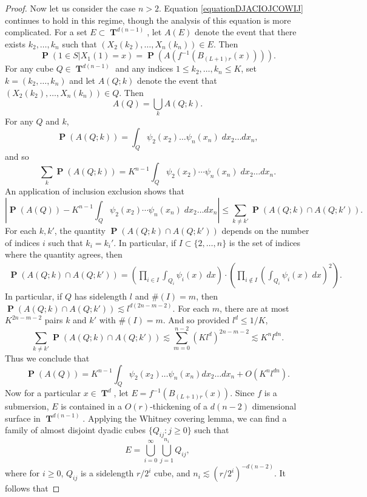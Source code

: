 \documentclass[12pt,reqno]{article}
\numberwithin{equation}{section}
\DeclareMathOperator{\TT}{\mathbf{T}}
\numberwithin{theorem}{section}
\DeclareMathOperator{\PP}{\mathbf{P}}
\begin{document}
\begin{proof}
    Now let us consider the case $n > 2$. Equation \eqref{equationDJACIOJCOWIJ} continues to hold in this regime, though the analysis of this equation is more complicated. For a set $E \subset \TT^{d(n-1)}$, let $A(E)$ denote the event that there exists $k_2,\dots,k_n$ such that $(X_2(k_2),\dots,X_n(k_n)) \in E$. Then
    \[ \PP( 1 \in S | X_1(1) = x ) = \PP(A(f^{-1}(B_{(L+1)r}(x)))). \]
    For any cube $Q \in \TT^{d(n-1)}$ and any indices $1 \leq k_2,\dots,k_n \leq K$, set $k = (k_2,\dots,k_n)$ and let $A(Q;k)$ denote the event that $(X_2(k_2),\dots,X_n(k_n)) \in Q$. Then
    \[ A(Q) = \bigcup_k A(Q;k). \]
    For any $Q$ and $k$,
    \[ \PP(A(Q;k)) = \int_Q \psi_2(x_2) \dots \psi_n(x_n)\; dx_2 \dots dx_n, \]
    and so
    \[ \sum_k \PP(A(Q;k)) = K^{n-1} \int_Q \psi_2(x_2) \cdots \psi_n(x_n)\; dx_2 \dots dx_n. \]
    An application of inclusion exclusion shows that
    \[ \left| \PP(A(Q)) - K^{n-1} \int_Q \psi_2(x_2) \cdots \psi_n(x_n)\; dx_2 \dots dx_n \right| \leq \sum_{k \neq k'} \PP(A(Q;k) \cap A(Q;k')). \]
    For each $k,k'$, the quantity $\PP(A(Q;k) \cap A(Q;k'))$ depends on the number of indices $i$ such that $k_i = k_i'$. In particular, if $I \subset \{ 2, \dots, n \}$ is the set of indices where the quantity agrees, then
    \begin{align*}
        \PP(A(Q;k) \cap A(Q;k')) = \left( \prod_{i \in I} \int_{Q_i} \psi_i(x)\; dx \right) \cdot \left( \prod_{i \not \in I} \left( \int_{Q_i} \psi_i(x)\; dx \right)^2 \right).
    \end{align*}
    In particular, if $Q$ has sidelength $l$ and $\#(I) = m$, then $\PP(A(Q;k) \cap A(Q;k')) \lesssim l^{d(2n - m - 2)}$. For each $m$, there are at most $K^{2n - m - 2}$ pairs $k$ and $k'$ with $\#(I) = m$. And so provided $l^d \leq 1/K$,
    \[ \sum_{k \neq k'} \PP(A(Q;k) \cap A(Q;k')) \lesssim \sum_{m = 0}^{n-2} (Kl^d)^{2n-m-2} \lesssim K^n l^{dn}. \]
    Thus we conclude that
    \[ \PP(A(Q)) = K^{n-1} \int_Q \psi_2(x_2) \dots \psi_n(x_n) dx_2 \dots dx_n + O(K^n l^{dn}). \]
    Now for a particular $x \in \TT^d$, let $E = f^{-1}(B_{(L+1)r}(x))$. Since $f$ is a submersion, $E$ is contained in a $O(r)$-thickening of a $d(n-2)$ dimensional surface in $\TT^{d(n-1)}$. Applying the Whitney covering lemma, we can find a family of almost disjoint dyadic cubes $\{ Q_{ij} : j \geq 0 \}$ such that
    \[ E = \bigcup_{i = 0}^\infty \bigcup_{j = 1}^{n_i} Q_{ij}, \]
    where for $i \geq 0$, $Q_{ij}$ is a sidelength $r/2^i$ cube, and $n_i \lesssim (r/2^i)^{-d(n-2)}$. It follows that

\end{proof}
\end{document}
